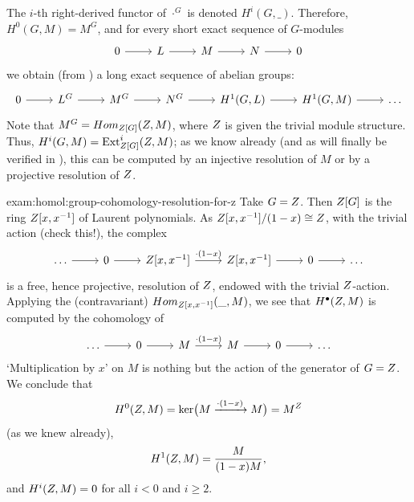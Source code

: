 The $i$-th right-derived functor of $\cdot^G$ is denoted $H^i(G,
\_)$. Therefore, $H^0(G, M) = M^G$, and for every short exact sequence
of $G$-modules
\[\begin{tikzcd}
    0 \arrow[r] & L \arrow[r] & M \arrow[r] & N \arrow[r] & 0
  \end{tikzcd}\] we obtain (from ) a long
exact sequence of abelian groups:
\[\begin{tikzcd}
    0 \arrow[r] & L^G \arrow[r] & M^G \arrow[r] & N^G \arrow[r] &
    H^1(G, L) \arrow[r] & H^1(G, M) \arrow[r] & \dots
  \end{tikzcd}\] Note that $M^G = Hom_{Z[G]}(Z, M)$, where $Z$ is
given the trivial module structure. Thus,
$H^i(G, M) = \operatorname{Ext}^i_{Z[G]}(Z, M)$; as we know already
(and as will finally be verified in
), this can be computed by an
injective resolution of $M$ or by a projective resolution of $Z$.
\begin{exam}{}{exam:homol:group-cohomology-resolution-for-z}
  Take $G = Z$. Then $Z[G]$ is the ring $Z[x,x^{-1}]$ of Laurent
  polynomials. As $Z[x,x^{-1}]/(1-x) \cong Z$, with the trivial
  action (check this!), the complex
  \[\begin{tikzcd}
      \dots \arrow[r] & 0 \arrow[r] & \Z[x,x^{-1}] \arrow[r,
      "\cdot(1-x)"] & \Z[x,x^{-1}] \arrow[r] & 0 \arrow[r] & \dots
    \end{tikzcd}\] is a free, hence projective, resolution of $Z$,
  endowed with the trivial $Z$-action. Applying the (contravariant)
  $Hom_{Z[x,x^{-1}]}(\_, M)$, we see that $H^\bullet(Z, M)$ is
  computed by the cohomology of
  \[\begin{tikzcd}
      \dots \arrow[r] & 0 \arrow[r] & M \arrow[r, "\cdot(1-x)"] & M
      \arrow[r] & 0 \arrow[r] & \dots
    \end{tikzcd}\] `Multiplication by $x$' on $M$ is nothing but the
  action of the generator of $G = Z$. We conclude that
  \[
    H^0(Z, M) = \ker\bigl(M \xrightarrow{\cdot(1-x)} M\bigr) = M^{Z}
  \]
  (as we knew already),
  \[
    H^1(Z, M) = \frac{M}{(1-x)M},
  \]
  and $H^i(Z, M) = 0$ for all $i < 0$ and $i \ge 2$.
\end{exam}

